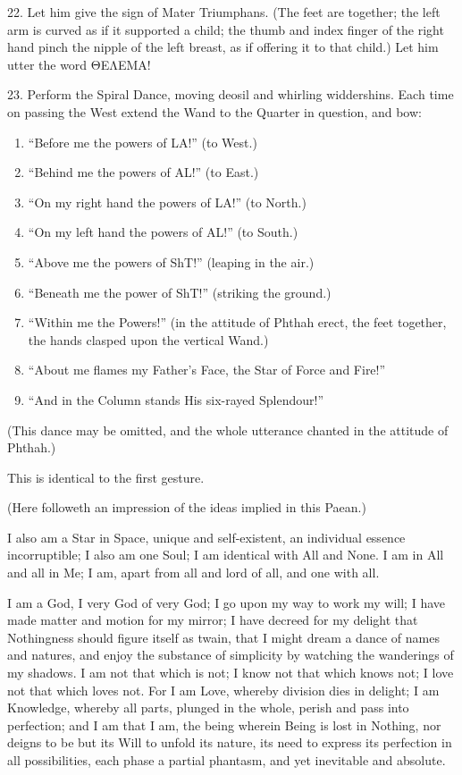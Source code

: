22. Let him give the sign of Mater Triumphans. (The feet are together; the left arm is curved as if it supported a child; the thumb and index finger of the right hand pinch the nipple of the left breast, as if offering it to that child.) Let him utter the word \textgreek{ΘΕΛΕΜΑ}!

23. Perform the Spiral Dance, moving deosil and whirling widdershins. Each time on passing the West extend the Wand to the Quarter in question, and bow:

\begin{enumerate}[label=\alph*.]
\item \enquote{Before me the powers of LA!} (to West.)
\item \enquote{Behind me the powers of AL!} (to East.)
\item \enquote{On my right hand the powers of LA!} (to North.)
\item \enquote{On my left hand the powers of AL!} (to South.)
\item \enquote{Above me the powers of ShT!} (leaping in the air.)
\item \enquote{Beneath me the power of ShT!} (striking the ground.)
\item \enquote{Within me the Powers!} (in the attitude of Phthah erect, the feet together, the hands clasped upon the vertical Wand.)
\item \enquote{About me flames my Father's Face, the Star of Force and Fire!}
\item \enquote{And in the Column stands His six-rayed Splendour!}
\end{enumerate}

(This dance may be omitted, and the whole utterance chanted in the attitude of Phthah.)


This is identical to the first gesture.

\raggedbottom\pagebreak

(Here followeth an impression of the ideas implied in this Paean.)


I also am a Star in Space, unique and self-existent, an individual
essence incorruptible; I also am one Soul; I am identical with All
and None. I am in All and all in Me; I am, apart from all and
lord of all, and one with all.

I am a God, I very God of very God; I go upon my way to work my will; I have made matter and motion for my mirror; I have decreed for my delight that Nothingness should figure itself as twain, that I might dream a dance of names and natures, and enjoy the substance of simplicity by watching the wanderings of my shadows. I am not that which is not; I know not that which knows not; I love not that which loves not. For I am Love, whereby division dies in delight; I am Knowledge, whereby all parts, plunged in the whole, perish and pass into perfection; and I am that I am, the being wherein Being is lost in Nothing, nor deigns to be but its Will to unfold its nature, its need to express its perfection in all possibilities, each phase a partial phantasm, and yet inevitable and absolute.

